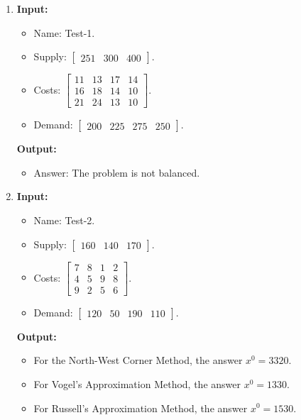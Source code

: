 \documentclass{article}
\begin{document}
\begin{enumerate}[label={(\arabic*)}, itemsep=0.25in]
    \item \textbf{Input:}
          \begin{itemize}
              \item Name: Test-1.
              \item Supply: \(\begin{bmatrix} 251 & 300 & 400 \end{bmatrix}\).
              \item Costs: \(\begin{bmatrix}
                        11 & 13 & 17 & 14 \\
                        16 & 18 & 14 & 10 \\
                        21 & 24 & 13 & 10
                    \end{bmatrix}\).
              \item Demand: \(\begin{bmatrix} 200 & 225 & 275 & 250 \end{bmatrix}\).
          \end{itemize}
          \textbf{Output:}
          \begin{itemize}
              \item Answer: The problem is not balanced.
          \end{itemize}

    \item \textbf{Input:}
          \begin{itemize}
              \item Name: Test-2.
              \item Supply: \(\begin{bmatrix} 160 & 140 & 170 \end{bmatrix}\).
              \item Costs: \(\begin{bmatrix}
                        7 & 8 & 1 & 2 \\
                        4 & 5 & 9 & 8 \\
                        9 & 2 & 5 & 6
                    \end{bmatrix}\).
              \item Demand: \(\begin{bmatrix} 120 & 50 & 190 & 110 \end{bmatrix}\).
          \end{itemize}
          \textbf{Output:}
          \begin{itemize}
              \item For the North-West Corner Method, the answer \(x^0 = \num{3320}\).
              \item For Vogel's Approximation Method, the answer \(x^0 = \num{1330}\).
              \item For Russell's Approximation Method, the answer \(x^0 = \num{1530}\).
          \end{itemize}


\end{enumerate}
\end{document}
